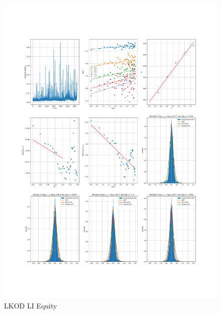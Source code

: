     \begin{figure}[h]
        \includegraphics[width=\textwidth]{fig/LKOD LI Equity.pdf}
        \caption{LKOD LI Equity}
    \end{figure} 

